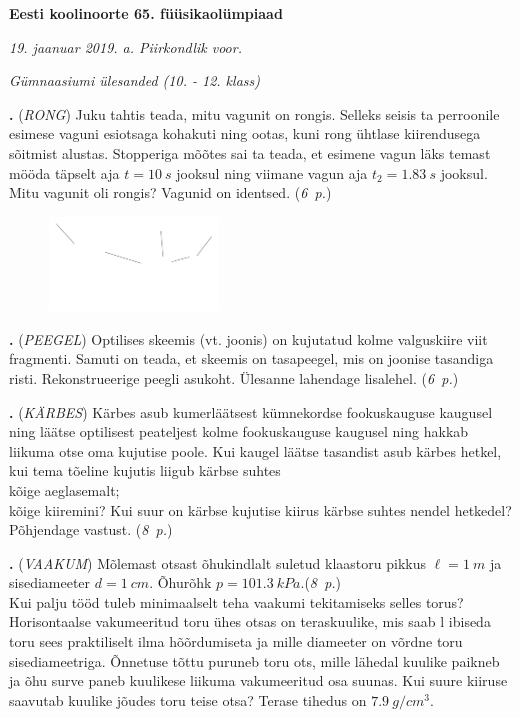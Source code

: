 \documentclass[12pt,a5paper]{article}
\newcommand{\numb}[1]{\vspace{5pt}\textbf{\large #1}}
\newcommand{\nimi}[1]{(\textsl{\small #1})}
\newcommand{\punktid}[1]{(\emph{#1~p.})}
\newcounter{ylesanne}
\newcommand{\yl}[1]{\addtocounter{ylesanne}{1}\numb{\theylesanne.} \nimi{#1} \newblock{}}
\begin{document}
\begin{center}
\textbf{\Large Eesti koolinoorte 65. füüsikaolümpiaad} \vspace{2pt}

\emph{19. jaanuar 2019. a. Piirkondlik voor.}

\emph{Gümnaasiumi ülesanded (10. - 12. klass)}

\end{center}

\yl{RONG} Juku tahtis teada, mitu vagunit on rongis. Selleks seisis ta perroonile esimese vaguni esiotsaga kohakuti ning ootas, kuni rong ühtlase kiirendusega sõitmist alustas.
Stopperiga mõõtes sai ta teada, et esimene vagun läks temast mööda täpselt aja $t=\SI{10}{s}$ jooksul ning viimane vagun aja  $t_2 = \SI{1.83}{s}$ jooksul. Mitu vagunit oli rongis?
Vagunid on identsed. \punktid{6}

\begin{figure}
\vspace{-10pt}
	\begin{center}
		\includegraphics[width = 0.4\textwidth]{peegel}
	\end{center}
\end{figure}

\yl{PEEGEL} Optilises skeemis (vt. joonis) on kujutatud kolme valguskiire viit fragmenti. Samuti on teada, et skeemis on tasapeegel, mis on joonise tasandiga risti. Rekonstrueerige peegli asukoht. Ülesanne lahendage lisalehel. \punktid{6}


\yl{KÄRBES}
Kärbes asub kumerläätsest kümnekordse fookuskauguse kaugusel ning läätse optilisest peateljest kolme fookuskauguse kaugusel ning hakkab liikuma otse oma kujutise poole. Kui kaugel läätse tasandist asub kärbes hetkel, kui tema tõeline kujutis liigub kärbse suhtes\\
\osa kõige aeglasemalt;\\
\osa kõige kiiremini? Kui suur on kärbse kujutise kiirus kärbse suhtes nendel hetkedel? Põhjendage vastust. \punktid{8}

\yl{VAAKUM} Mõlemast otsast õhukindlalt suletud klaastoru pikkus $\ell=\SI{1}{m}$ ja sisediameeter $d=\SI{1}{cm}$. Õhurõhk $p=\SI{101.3}{kPa}$.\punktid{8}\\
\osa Kui palju tööd tuleb minimaalselt teha vaakumi tekitamiseks selles torus?\\
\osa Horisontaalse vakumeeritud toru ühes otsas on teraskuulike, mis saab l	ibiseda toru sees praktiliselt ilma hõõrdumiseta ja mille diameeter on võrdne toru sisediameetriga. Õnnetuse tõttu puruneb toru ots, mille lähedal kuulike paikneb  ja õhu surve paneb kuulikese liikuma vakumeeritud osa suunas. Kui suure kiiruse saavutab kuulike jõudes toru teise otsa? Terase tihedus on $\SI{7.9}{g/cm^3}$.
\end{document}
